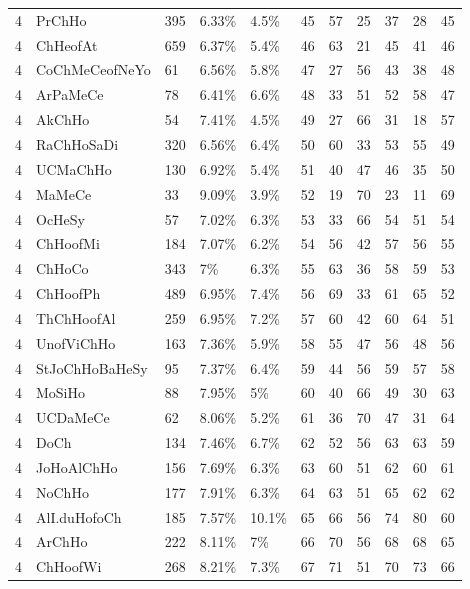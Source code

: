 \begin{longtable}{lllllrrrrrr}
  4 & PrChHo & 395 & 6.33\% & 4.5\% &  45 &  57 &  25 &  37 &  28 &  45 \\ 
  4 & ChHeofAt & 659 & 6.37\% & 5.4\% &  46 &  63 &  21 &  45 &  41 &  46 \\ 
  4 & CoChMeCeofNeYo & 61 & 6.56\% & 5.8\% &  47 &  27 &  56 &  43 &  38 &  48 \\ 
  4 & ArPaMeCe & 78 & 6.41\% & 6.6\% &  48 &  33 &  51 &  52 &  58 &  47 \\ 
  4 & AkChHo & 54 & 7.41\% & 4.5\% &  49 &  27 &  66 &  31 &  18 &  57 \\ 
  4 & RaChHoSaDi & 320 & 6.56\% & 6.4\% &  50 &  60 &  33 &  53 &  55 &  49 \\ 
  4 & UCMaChHo & 130 & 6.92\% & 5.4\% &  51 &  40 &  47 &  46 &  35 &  50 \\ 
  4 & MaMeCe & 33 & 9.09\% & 3.9\% &  52 &  19 &  70 &  23 &  11 &  69 \\ 
  4 & OcHeSy & 57 & 7.02\% & 6.3\% &  53 &  33 &  66 &  54 &  51 &  54 \\ 
  4 & ChHoofMi & 184 & 7.07\% & 6.2\% &  54 &  56 &  42 &  57 &  56 &  55 \\ 
  4 & ChHoCo & 343 & 7\% & 6.3\% &  55 &  63 &  36 &  58 &  59 &  53 \\ 
  4 & ChHoofPh & 489 & 6.95\% & 7.4\% &  56 &  69 &  33 &  61 &  65 &  52 \\ 
  4 & ThChHoofAl & 259 & 6.95\% & 7.2\% &  57 &  60 &  42 &  60 &  64 &  51 \\ 
  4 & UnofViChHo & 163 & 7.36\% & 5.9\% &  58 &  55 &  47 &  56 &  48 &  56 \\ 
  4 & StJoChHoBaHeSy & 95 & 7.37\% & 6.4\% &  59 &  44 &  56 &  59 &  57 &  58 \\ 
  4 & MoSiHo & 88 & 7.95\% & 5\% &  60 &  40 &  66 &  49 &  30 &  63 \\ 
  4 & UCDaMeCe & 62 & 8.06\% & 5.2\% &  61 &  36 &  70 &  47 &  31 &  64 \\ 
  4 & DoCh & 134 & 7.46\% & 6.7\% &  62 &  52 &  56 &  63 &  63 &  59 \\ 
  4 & JoHoAlChHo & 156 & 7.69\% & 6.3\% &  63 &  60 &  51 &  62 &  60 &  61 \\ 
  4 & NoChHo & 177 & 7.91\% & 6.3\% &  64 &  63 &  51 &  65 &  62 &  62 \\ 
  4 & AlI.duHofoCh & 185 & 7.57\% & 10.1\% &  65 &  66 &  56 &  74 &  80 &  60 \\ 
  4 & ArChHo & 222 & 8.11\% & 7\% &  66 &  70 &  56 &  68 &  68 &  65 \\ 
  4 & ChHoofWi & 268 & 8.21\% & 7.3\% &  67 &  71 &  51 &  70 &  73 &  66 \\ 

\end{longtable}
